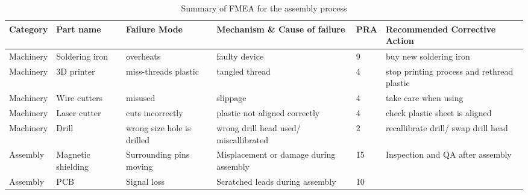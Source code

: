     \begin{table}
        \centering
        \begin{tabular}{b{1.7cm} b{2cm} b{2.5cm} b{4cm}l b{6cm}}
            \textbf{Category} & \textbf{Part name} & \textbf{Failure Mode} & \textbf{Mechanism \& Cause of failure} & \textbf{PRA} & \textbf{Recommended Corrective Action} \\ \hline
            Machinery & Soldering iron & overheats & faulty device & 9 & buy new soldering iron  \\ 
            Machinery & 3D printer  & miss-threads plastic & tangled thread & 4 & stop printing process and rethread plastic \\ 
            Machinery & Wire cutters  & misused & slippage  & 4 & take care when using \\ 
            Machinery & Laser cutter & cuts incorrectly & plastic not aligned correctly & 4 & check plastic sheet is aligned  \\ 
            Machinery & Drill & wrong size hole is drilled & wrong drill head used/ miscallibrated  & 2 & recallibrate drill/ swap drill head \\ 
            Assembly & Magnetic shielding & Surrounding pins moving & Misplacement or damage during assembly & 15 & Inspection and QA after assembly \\ 
            Assembly & PCB & Signal loss & Scratched leads during assembly & 10 & ~\\ \hline
        \end{tabular}
        \caption[]{Summary of FMEA for the assembly process}
    \end{table}
\restoregeometry